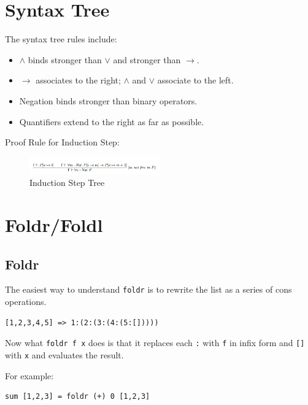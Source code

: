 \documentclass{article}
\begin{document}
\section{Syntax Tree}

The syntax tree rules include:
\begin{itemize}
    \item $\land$ binds stronger than $\lor$ and stronger than $\rightarrow$.
    \item $\rightarrow$ associates to the right; $\land$ and $\lor$ associate to the left.
    \item Negation binds stronger than binary operators.
    \item Quantifiers extend to the right as far as possible.
\end{itemize}

Proof Rule for Induction Step:

\begin{figure}[ht]
    \centering
    \includegraphics[width=0.5\textwidth]{assets/induction-step-tree.png}
    \caption{Induction Step Tree}
\end{figure}

\section{Foldr/Foldl}


\subsection{Foldr}



The easiest way to understand \texttt{foldr} is to rewrite the list as a series of cons operations.

\begin{lstlisting}[style=haskellstyle, caption=Haskell Code, label=code:haskell]
    [1,2,3,4,5] => 1:(2:(3:(4:(5:[]))))
\end{lstlisting}

Now what \texttt{foldr f x} does is that it replaces each \texttt{:} with \texttt{f} in infix form and \texttt{[]} with \texttt{x} and evaluates the result.

For example:

\begin{lstlisting}[style=haskellstyle, caption=Haskell Code, label=code:haskell]
    sum [1,2,3] = foldr (+) 0 [1,2,3]
\end{lstlisting}
\end{document}
